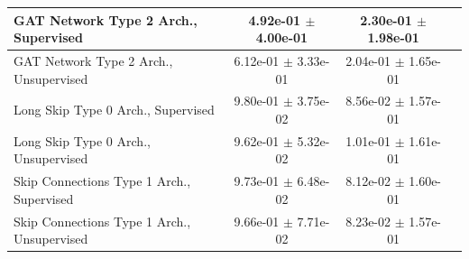 \documentclass[a4paper]{article}
\begin{document}
\begin{table}[H]
\begin{tabular}{|l|c|c|c|}
GAT Network Type 2 Arch., Supervised   & 4.92e-01 $\pm$ 4.00e-01 & 2.30e-01 $\pm$ 1.98e-01 \\ \hline
GAT Network Type 2 Arch., Unsupervised   & 6.12e-01 $\pm$ 3.33e-01 & 2.04e-01 $\pm$ 1.65e-01 \\ \hline
Long Skip Type 0 Arch., Supervised   & 9.80e-01 $\pm$ 3.75e-02 & 8.56e-02 $\pm$ 1.57e-01 \\ \hline
Long Skip Type 0 Arch., Unsupervised   & 9.62e-01 $\pm$ 5.32e-02 & 1.01e-01 $\pm$ 1.61e-01 \\ \hline
Skip Connections Type 1 Arch., Supervised   & 9.73e-01 $\pm$ 6.48e-02 & 8.12e-02 $\pm$ 1.60e-01 \\ \hline
Skip Connections Type 1 Arch., Unsupervised   & 9.66e-01 $\pm$ 7.71e-02 & 8.23e-02 $\pm$ 1.57e-01 \\ \hline
      \end{tabular}
      \label{fig:13_tab1}
\end{table}
\end{document}
